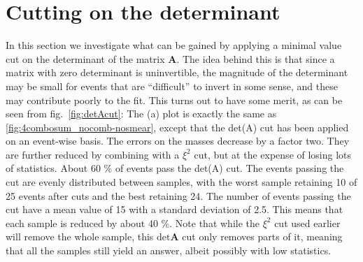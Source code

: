\documentclass[twoside,english]{uiofysmaster}
\begin{document}
\section{Cutting on the determinant}
In this section we investigate what can be gained by applying a minimal value cut on the determinant of the matrix $\mathbf{A}$. The idea behind this is that since a matrix with zero determinant is uninvertible, the magnitude of the determinant may be small for events that are ``difficult'' to invert in some sense, and these may contribute poorly to the fit. This turns out to have some merit, as can be seen from fig.\ \ref{fig:detAcut}: The (a) plot is exactly the same as \ref{fig:4combosum_nocomb-nosmear}, except that the det(A) cut has been applied on an event-wise basis. The errors on the masses decrease by a factor two. They are further reduced by combining with a $\xi^2$ cut, but at the expense of losing lots of statistics. About 60 \% of events pass the det(A) cut. The events passing the cut are evenly distributed between samples, with the worst sample retaining 10 of 25 events after cuts and the best retaining 24. The number of events passing the cut have a mean value of 15 with a standard deviation of 2.5. This means that each sample is reduced by about 40 \%. Note that while the $\xi^2$ cut used earlier will remove the whole sample, this $\mathrm{det}\mathbf{A}$ cut only removes parts of it, meaning that all the samples still yield an answer, albeit possibly with low statistics.
\end{document}
